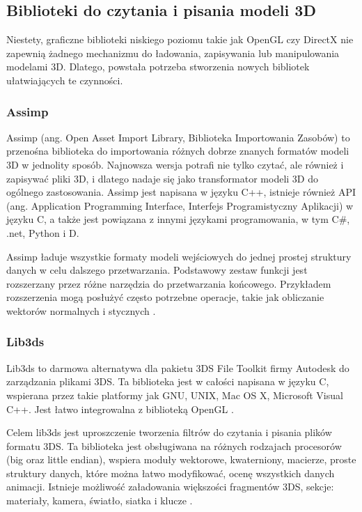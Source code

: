 \subsection{Biblioteki do czytania i pisania modeli 3D}
Niestety, graficzne biblioteki niskiego poziomu takie jak OpenGL czy DirectX nie zapewnią żadnego mechanizmu do ładowania, zapisywania lub manipulowania modelami 3D. Dlatego, powstała potrzeba stworzenia nowych bibliotek ułatwiających te czynności. 

\subsubsection{Assimp}
Assimp (ang. Open Asset Import Library, Biblioteka Importowania Zasobów) to przenośna biblioteka do importowania różnych dobrze znanych formatów modeli 3D w jednolity sposób. Najnowsza wersja potrafi nie tylko czytać, ale również i zapisywać pliki 3D, i dlatego nadaje się jako transformator modeli 3D do ogólnego zastosowania. Assimp jest napisana w języku C++, istnieje również API (ang. Application Programming Interface, Interfejs Programistyczny Aplikacji) w języku C, a także jest powiązana z innymi językami programowania, w tym C\#, .net, Python i D.

Assimp ładuje wszystkie formaty modeli wejściowych do jednej prostej struktury danych w celu dalszego przetwarzania. Podstawowy zestaw funkcji jest rozszerzany przez różne narzędzia do przetwarzania końcowego. Przykładem rozszerzenia mogą posłużyć często potrzebne operacje, takie jak obliczanie wektorów normalnych i stycznych \cite{assimp}.

\subsubsection{Lib3ds}
Lib3ds to darmowa alternatywa dla pakietu 3DS File Toolkit firmy Autodesk do zarządzania plikami 3DS. Ta biblioteka jest w całości napisana w języku C, wspierana przez takie platformy jak GNU, UNIX, Mac OS X, Microsoft Visual C++. Jest łatwo integrowalna z biblioteką OpenGL \cite{lib3dsofficial}.

Celem lib3ds jest uproszczenie tworzenia filtrów do czytania i pisania plików formatu 3DS. Ta biblioteka jest obsługiwana na różnych rodzajach procesorów (big oraz little endian), wspiera moduły wektorowe, kwaterniony, macierze, proste struktury danych, które można łatwo modyfikować, ocenę wszystkich danych animacji. Istnieje możliwość załadowania większości fragmentów 3DS, sekcje: materiały, kamera, światło, siatka i klucze \cite{lib3dsdirectory}.

